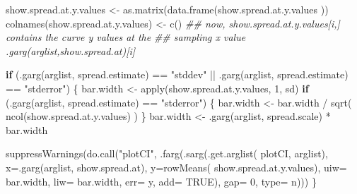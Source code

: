 \documentclass[
  letterpaper,
  DIV=11,
  numbers=noendperiod]{scrartcl}
\newenvironment{Shaded}{\begin{snugshade}}{\end{snugshade}}
\newcommand{\AttributeTok}[1]{\textcolor[rgb]{0.40,0.45,0.13}{#1}}
\newcommand{\ConstantTok}[1]{\textcolor[rgb]{0.56,0.35,0.01}{#1}}
\newcommand{\ControlFlowTok}[1]{\textcolor[rgb]{0.00,0.23,0.31}{\textbf{#1}}}
\newcommand{\DecValTok}[1]{\textcolor[rgb]{0.68,0.00,0.00}{#1}}
\newcommand{\DocumentationTok}[1]{\textcolor[rgb]{0.37,0.37,0.37}{\textit{#1}}}
\newcommand{\FunctionTok}[1]{\textcolor[rgb]{0.28,0.35,0.67}{#1}}
\newcommand{\NormalTok}[1]{\textcolor[rgb]{0.00,0.23,0.31}{#1}}
\newcommand{\OtherTok}[1]{\textcolor[rgb]{0.00,0.23,0.31}{#1}}
\newcommand{\SpecialCharTok}[1]{\textcolor[rgb]{0.37,0.37,0.37}{#1}}
\newcommand{\StringTok}[1]{\textcolor[rgb]{0.13,0.47,0.30}{#1}}
\begin{document}
\begin{Shaded}
\begin{Highlighting}[]
\NormalTok{    show.spread.at.y.values }\OtherTok{\textless{}{-}} \FunctionTok{as.matrix}\NormalTok{(}\FunctionTok{data.frame}\NormalTok{(show.spread.at.y.values ))}
    \FunctionTok{colnames}\NormalTok{(show.spread.at.y.values) }\OtherTok{\textless{}{-}} \FunctionTok{c}\NormalTok{()}
    \DocumentationTok{\#\# now, show.spread.at.y.values[i,] contains the curve y values at the}
    \DocumentationTok{\#\# sampling x value .garg(arglist,\textquotesingle{}show.spread.at\textquotesingle{})[i]}
    
    \ControlFlowTok{if}\NormalTok{ (}\FunctionTok{.garg}\NormalTok{(arglist, }\StringTok{\textquotesingle{}spread.estimate\textquotesingle{}}\NormalTok{) }\SpecialCharTok{==} \StringTok{"stddev"} \SpecialCharTok{||}
        \FunctionTok{.garg}\NormalTok{(arglist, }\StringTok{\textquotesingle{}spread.estimate\textquotesingle{}}\NormalTok{) }\SpecialCharTok{==} \StringTok{"stderror"}\NormalTok{) \{}
\NormalTok{        bar.width }\OtherTok{\textless{}{-}} \FunctionTok{apply}\NormalTok{(show.spread.at.y.values, }\DecValTok{1}\NormalTok{, sd)}
        \ControlFlowTok{if}\NormalTok{ (}\FunctionTok{.garg}\NormalTok{(arglist, }\StringTok{\textquotesingle{}spread.estimate\textquotesingle{}}\NormalTok{) }\SpecialCharTok{==} \StringTok{"stderror"}\NormalTok{) \{}
\NormalTok{            bar.width }\OtherTok{\textless{}{-}}\NormalTok{ bar.width }\SpecialCharTok{/} \FunctionTok{sqrt}\NormalTok{( }\FunctionTok{ncol}\NormalTok{(show.spread.at.y.values) )}
\NormalTok{        \}}
\NormalTok{        bar.width }\OtherTok{\textless{}{-}} \FunctionTok{.garg}\NormalTok{(arglist, }\StringTok{\textquotesingle{}spread.scale\textquotesingle{}}\NormalTok{) }\SpecialCharTok{*}\NormalTok{ bar.width}

        \FunctionTok{suppressWarnings}\NormalTok{(}\FunctionTok{do.call}\NormalTok{(}\StringTok{"plotCI"}\NormalTok{,}
                                 \FunctionTok{.farg}\NormalTok{(}\FunctionTok{.sarg}\NormalTok{(}\FunctionTok{.get.arglist}\NormalTok{( }\StringTok{\textquotesingle{}plotCI\textquotesingle{}}\NormalTok{, arglist),}
                                             \AttributeTok{x=}\FunctionTok{.garg}\NormalTok{(arglist,}
                                               \StringTok{\textquotesingle{}show.spread.at\textquotesingle{}}\NormalTok{),}
                                             \AttributeTok{y=}\FunctionTok{rowMeans}\NormalTok{(}
\NormalTok{                                               show.spread.at.y.values),}
                                             \AttributeTok{uiw=}\NormalTok{ bar.width,}
                                             \AttributeTok{liw=}\NormalTok{ bar.width,}
                                             \AttributeTok{err=} \StringTok{\textquotesingle{}y\textquotesingle{}}\NormalTok{,}
                                             \AttributeTok{add=} \ConstantTok{TRUE}\NormalTok{),}
                                       \AttributeTok{gap=} \DecValTok{0}\NormalTok{,}
                                       \AttributeTok{type=} \StringTok{\textquotesingle{}n\textquotesingle{}}\NormalTok{)))}
\NormalTok{    \}}
    

\end{Highlighting}
\end{Shaded}
\end{document}
